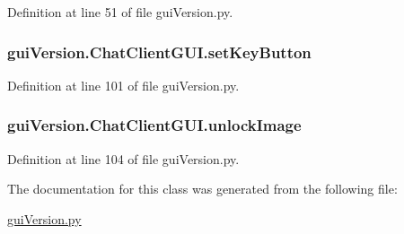 Definition at line 51 of file gui\+Version.\+py.

\hypertarget{classgui_version_1_1_chat_client_g_u_i_a6f8fa5385bc6fa43fe07f02151b54dac}{}
\subsubsection[{set\+Key\+Button}]{\setlength{\rightskip}{0pt plus 5cm}gui\+Version.\+Chat\+Client\+G\+U\+I.\+set\+Key\+Button}\label{classgui_version_1_1_chat_client_g_u_i_a6f8fa5385bc6fa43fe07f02151b54dac}


Definition at line 101 of file gui\+Version.\+py.

\hypertarget{classgui_version_1_1_chat_client_g_u_i_ac9bcddaa82b6d786fa50638f18fd814b}{}
\subsubsection[{unlock\+Image}]{\setlength{\rightskip}{0pt plus 5cm}gui\+Version.\+Chat\+Client\+G\+U\+I.\+unlock\+Image}\label{classgui_version_1_1_chat_client_g_u_i_ac9bcddaa82b6d786fa50638f18fd814b}


Definition at line 104 of file gui\+Version.\+py.



The documentation for this class was generated from the following file\+:\begin{DoxyCompactItemize}
\item 
\hyperlink{gui_version_8py}{gui\+Version.\+py}\end{DoxyCompactItemize}

